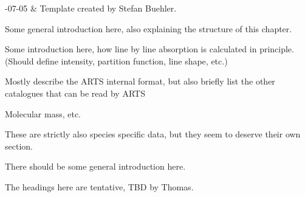 %
%
 \label{sec:absorption}


%
%
-07-05 & Template created by Stefan Buehler.\\
\stophistory


%
%
%


Some general introduction here, also explaining the structure of this chapter.



\label{sec:line_absorption}

Some introduction here, how line by line absorption is calculated in
principle. (Should define intensity, partition function, line shape, etc.)


Mostly describe the ARTS internal format, but also briefly list the
other catalogues that can be read by ARTS


Molecular mass, etc. 


These are strictly also species specific data, but they seem to deserve
their own section.







There should be some general introduction here.

The headings here are tentative, TBD by Thomas.





 




